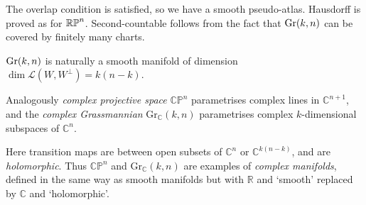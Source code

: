 \documentclass[a4paper,11pt]{article}
\begin{document}
	The overlap condition is satisfied, so we have a smooth pseudo-atlas. Hausdorff is proved as for $\mathbb{RP}^{n}$. Second-countable follows from the fact that $\mathrm{Gr}({k},{n})$ can be covered by finitely many charts.

	\begin{prop}
		$\mathrm{Gr}({k},{n})$ is naturally a smooth manifold of dimension\\ $\dim \mathcal{L}(W,W^\perp) = k(n-k)$. 
	\end{prop}

	\begin{rmk}
		Analogously \emph{complex projective space} $\mathbb{CP}^n$ parametrises complex lines in $\mathbb{C}^{n+1}$, and the \emph{complex Grassmannian} $\mathrm{Gr}_{\mathbb{C}}(k,n)$ parametrises complex $k$-dimensional subspaces of $\mathbb{C}^n$.
	\end{rmk}

	Here transition maps are between open subsets of $\mathbb{C}^n$ or $\mathbb{C}^{k(n-k)}$, and are \emph{holomorphic}. Thus $\mathbb{CP}^n$ and $\mathrm{Gr}_{\mathbb{C}}(k,n)$ are examples of \emph{complex manifolds}, defined in the same way as smooth manifolds but with $\mathbb{R}$ and `smooth' replaced by $\mathbb{C}$ and `holomorphic'.
\end{document}

